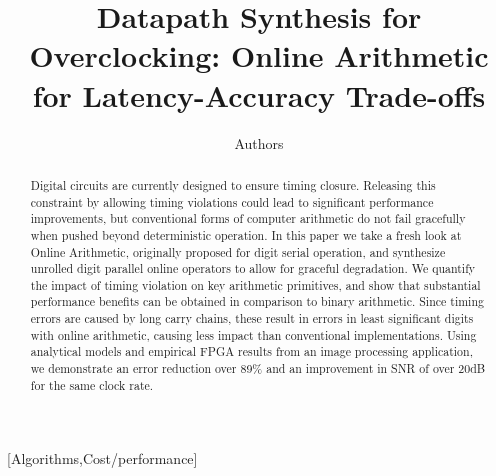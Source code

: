 \documentclass{acm_proc_article-sp}
\begin{document}
\title{Datapath Synthesis for Overclocking: Online Arithmetic for Latency-Accuracy Trade-offs}


%
\author{
\alignauthor
Authors
}

\maketitle

\begin{abstract}
Digital circuits are currently designed to ensure timing closure. Releasing this constraint by allowing timing violations could lead to significant performance improvements, but conventional forms of computer arithmetic do not fail gracefully when pushed beyond deterministic operation. In this paper we take a fresh look at Online Arithmetic, originally proposed for digit serial operation, and synthesize unrolled digit parallel online operators to allow for graceful degradation. We quantify the impact of timing violation on key arithmetic primitives, and show that substantial performance benefits can be obtained in comparison to binary arithmetic. Since timing errors are caused by long carry chains, these result in errors in least significant digits with online arithmetic, causing less impact than conventional implementations. Using analytical models and empirical FPGA results from an image processing application, we demonstrate an error reduction over 89\% and an improvement in SNR of over 20dB for the same clock rate.
\end{abstract}
%
\vspace{-1ex}
[Algorithms,Cost/performance]
\vspace{-1ex}
\vspace{-1ex}
\end{document}

